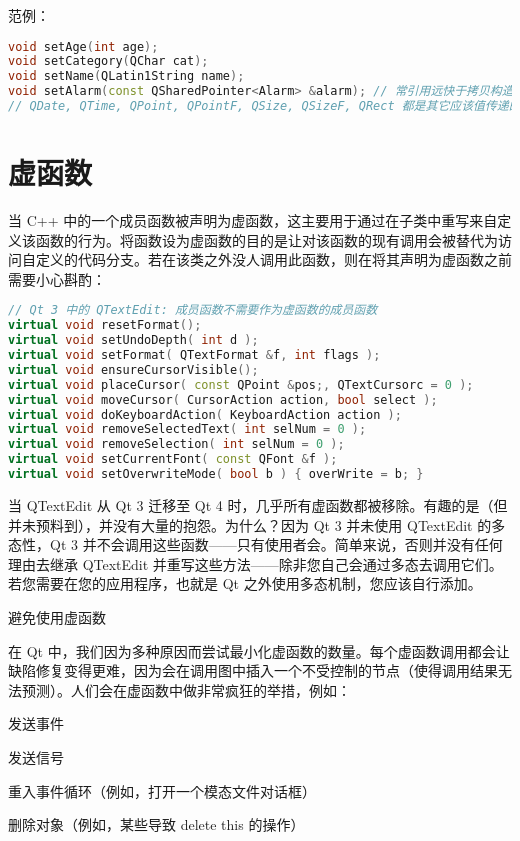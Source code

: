 范例：

\begin{lstlisting}[language=C++]
void setAge(int age);
void setCategory(QChar cat);
void setName(QLatin1String name);
void setAlarm(const QSharedPointer<Alarm> &alarm); // 常引用远快于拷贝构造和析构
// QDate, QTime, QPoint, QPointF, QSize, QSizeF, QRect 都是其它应该值传递的好例子
\end{lstlisting}

\section{虚函数}

当 C++ 中的一个成员函数被声明为虚函数，这主要用于通过在子类中重写来自定义该函数的行为。将函数设为虚函数的目的是让对该函数的现有调用会被替代为访问自定义的代码分支。若在该类之外没人调用此函数，则在将其声明为虚函数之前需要小心斟酌：

\begin{lstlisting}[language=C++]
// Qt 3 中的 QTextEdit: 成员函数不需要作为虚函数的成员函数
virtual void resetFormat();
virtual void setUndoDepth( int d );
virtual void setFormat( QTextFormat &f, int flags );
virtual void ensureCursorVisible();
virtual void placeCursor( const QPoint &pos;, QTextCursorc = 0 );
virtual void moveCursor( CursorAction action, bool select );
virtual void doKeyboardAction( KeyboardAction action );
virtual void removeSelectedText( int selNum = 0 );
virtual void removeSelection( int selNum = 0 );
virtual void setCurrentFont( const QFont &f );
virtual void setOverwriteMode( bool b ) { overWrite = b; }
\end{lstlisting}

当 QTextEdit 从 Qt 3 迁移至 Qt 4 时，几乎所有虚函数都被移除。有趣的是（但并未预料到），并没有大量的抱怨。为什么？因为 Qt 3 并未使用 QTextEdit 的多态性，Qt 3 并不会调用这些函数——只有使用者会。简单来说，否则并没有任何理由去继承 QTextEdit 并重写这些方法——除非您自己会通过多态去调用它们。若您需要在您的应用程序，也就是 Qt 之外使用多态机制，您应该自行添加。

避免使用虚函数

在 Qt 中，我们因为多种原因而尝试最小化虚函数的数量。每个虚函数调用都会让缺陷修复变得更难，因为会在调用图中插入一个不受控制的节点（使得调用结果无法预测）。人们会在虚函数中做非常疯狂的举措，例如：

\begin{compactitem}[\arr]
\item 发送事件
\item 发送信号
\item 重入事件循环（例如，打开一个模态文件对话框）
\item 删除对象（例如，某些导致 delete this 的操作）
\end{compactitem}

